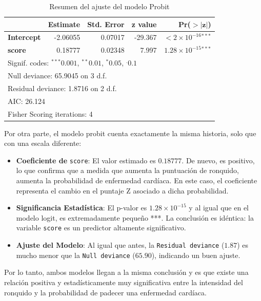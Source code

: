 \begin{table}[H]
\centering
\caption{Resumen del ajuste del modelo Probit}
\label{tab:probit_summary}
\begin{tabular}{lrrrr}
\hline
 & \textbf{Estimate} & \textbf{Std. Error} & \textbf{z value} & \textbf{Pr($\mathbf{>|z|}$)} \\
\hline
\textbf{Intercept} & -2.06055 & 0.07017 & -29.367 & $<2 \times 10^{-16}$$^{***}$ \\
\textbf{score}     & 0.18777  & 0.02348 & 7.997   & $1.28 \times 10^{-15}$$^{***}$ \\
\hline
\multicolumn{5}{l}{\footnotesize Signif. codes: $^{***}0.001$, $^{**}0.01$, $^{*}0.05$, $^{.}0.1$} \\
\multicolumn{5}{l}{\footnotesize Null deviance: 65.9045 on 3 d.f.} \\
\multicolumn{5}{l}{\footnotesize Residual deviance: 1.8716 on 2 d.f.} \\
\multicolumn{5}{l}{\footnotesize AIC: 26.124} \\
\multicolumn{5}{l}{\footnotesize Fisher Scoring iterations: 4} \\
\end{tabular}
\end{table}

Por otra parte, el modelo probit cuenta exactamente la misma historia, solo que con una escala diferente:

\begin{itemize}
    \item \textbf{Coeficiente de} \texttt{score}: El valor estimado es $0.18777$. De nuevo, es positivo, lo que confirma que a medida que aumenta la puntuación de ronquido, aumenta la probabilidad de enfermedad cardíaca. En este caso, el coeficiente representa el cambio en el puntaje Z asociado a dicha probabilidad.
    
    \item \textbf{Significancia Estadística}: El p-valor es $1.28 \times 10^{-15}$ y al igual que en el modelo logit, es extremadamente pequeño ***. La conclusión es idéntica: la variable \texttt{score} es un predictor altamente significativo.
    
    \item \textbf{Ajuste del Modelo}: Al igual que antes, la \texttt{Residual deviance} ($1.87$) es mucho menor que la \texttt{Null deviance} ($65.90$), indicando un buen ajuste.
\end{itemize}

\begin{tcolorbox}
Por lo tanto, ambos modelos llegan a la misma conclusión y es que existe una relación positiva y estadísticamente muy significativa entre la intensidad del ronquido y la probabilidad de padecer una enfermedad cardíaca.
\end{tcolorbox}

